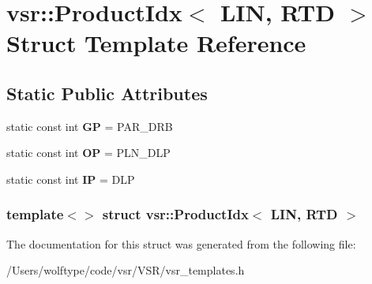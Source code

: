 \hypertarget{structvsr_1_1_product_idx_3_01_l_i_n_00_01_r_t_d_01_4}{\section{vsr\-:\-:Product\-Idx$<$ L\-I\-N, R\-T\-D $>$ Struct Template Reference}
\label{structvsr_1_1_product_idx_3_01_l_i_n_00_01_r_t_d_01_4}
}
\subsection*{Static Public Attributes}
\begin{DoxyCompactItemize}
\item 
\hypertarget{structvsr_1_1_product_idx_3_01_l_i_n_00_01_r_t_d_01_4_a0b741812f443d1c0ab789afec2941257}{static const int {\bfseries G\-P} = P\-A\-R\-\_\-\-D\-R\-B}\label{structvsr_1_1_product_idx_3_01_l_i_n_00_01_r_t_d_01_4_a0b741812f443d1c0ab789afec2941257}

\item 
\hypertarget{structvsr_1_1_product_idx_3_01_l_i_n_00_01_r_t_d_01_4_a5d26923f4258ae26702ee4836f3bd2fd}{static const int {\bfseries O\-P} = P\-L\-N\-\_\-\-D\-L\-P}\label{structvsr_1_1_product_idx_3_01_l_i_n_00_01_r_t_d_01_4_a5d26923f4258ae26702ee4836f3bd2fd}

\item 
\hypertarget{structvsr_1_1_product_idx_3_01_l_i_n_00_01_r_t_d_01_4_a7cf429a291cee8ae3e61eb7545b9c029}{static const int {\bfseries I\-P} = D\-L\-P}\label{structvsr_1_1_product_idx_3_01_l_i_n_00_01_r_t_d_01_4_a7cf429a291cee8ae3e61eb7545b9c029}

\end{DoxyCompactItemize}
\subsubsection*{template$<$$>$ struct vsr\-::\-Product\-Idx$<$ L\-I\-N, R\-T\-D $>$}



The documentation for this struct was generated from the following file\-:\begin{DoxyCompactItemize}
\item 
/\-Users/wolftype/code/vsr/\-V\-S\-R/vsr\-\_\-templates.\-h\end{DoxyCompactItemize}
